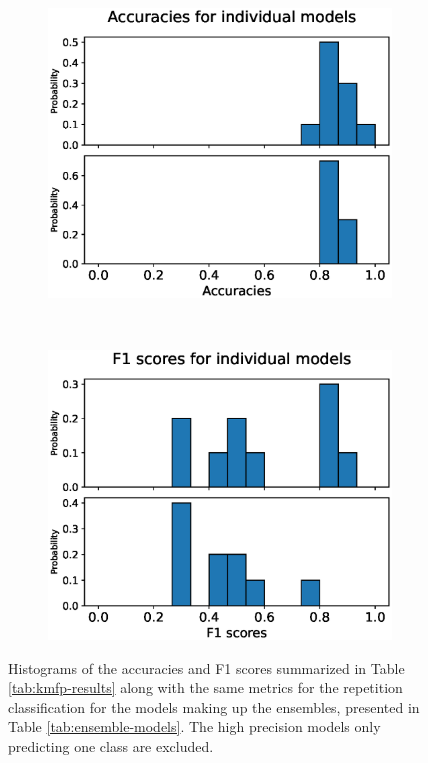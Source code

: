 \begin{figure}
  \begin{subfigure}[t]{0.4\textwidth}
    \includegraphics[width=\textwidth]{files/figs/res/kmfp/acc-ind.eps}
    \caption{}
    \label{fig:kmfp-acc-ind}
  \end{subfigure}
  ~
  \begin{subfigure}[t]{0.4\textwidth}
    \includegraphics[width=\textwidth]{files/figs/res/kmfp/f1-ind.eps}
    \caption{}
    \label{fig:kmfp-f1-ind}
  \end{subfigure}
  \caption{Histograms of the accuracies and F1 scores summarized in Table \ref{tab:kmfp-results} along with the same metrics for the repetition classification for the models making up the ensembles, presented in Table \ref{tab:ensemble-models}. The high precision models only predicting one class are excluded.}
  \label{fig:kmfp-hist-results}
\end{figure}


